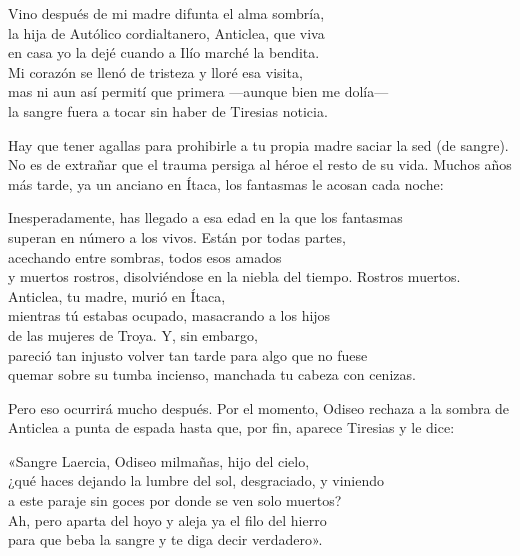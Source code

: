 \begin{versocita}
Vino después de mi madre difunta el alma sombría,\\
la hija de Autólico cordialtanero, Anticlea, que viva\\
en casa yo la dejé cuando a Ilío marché la bendita.\\
Mi corazón se llenó de tristeza y lloré esa visita,\\
mas ni aun así permití que primera ---aunque bien me dolía---\\
la sangre fuera a tocar sin haber de Tiresias noticia.
\end{versocita}

Hay que tener agallas para prohibirle a tu propia madre saciar la sed (de sangre). No es de extrañar que el trauma persiga al héroe el resto de su vida. Muchos años más tarde, ya un anciano en Ítaca, los fantasmas le acosan cada noche:

\begin{versopropio}
Inesperadamente, has llegado a esa edad en la que los fantasmas\\
superan en número a los vivos. Están por todas partes,\\
acechando entre sombras, todos esos amados\\
y muertos rostros, disolviéndose en la niebla del tiempo.
\stanzabreak
Rostros muertos. Anticlea, tu madre, murió en Ítaca,\\
mientras tú estabas ocupado, masacrando a los hijos\\
de las mujeres de Troya. Y, sin embargo,\\
pareció tan injusto volver tan tarde para algo que no fuese\\
quemar sobre su tumba incienso, manchada tu cabeza con cenizas.
\end{versopropio}

Pero eso ocurrirá mucho después. Por el momento, Odiseo rechaza a la sombra de Anticlea a punta de espada
hasta que, por fin, aparece Tiresias y le dice:

\begin{versocita}
«Sangre Laercia, Odiseo milmañas, hijo del cielo,\\
¿qué haces dejando la lumbre del sol, desgraciado, y viniendo\\
a este paraje sin goces por donde se ven solo muertos?\\
Ah, pero aparta del hoyo y aleja ya el filo del hierro\\
para que beba la sangre y te diga decir verdadero».
\end{versocita}

